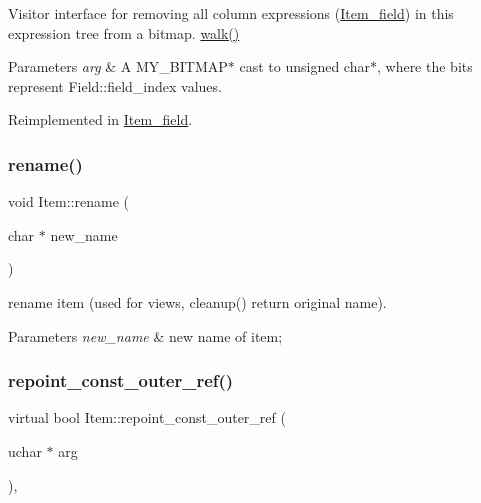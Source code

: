Visitor interface for removing all column expressions (\mbox{\hyperlink{classItem__field}{Item\+\_\+field}}) in this expression tree from a bitmap.  \mbox{\hyperlink{classItem_ab7d2529511c14a77e59a1b1bbabc95d7}{walk()}}


\begin{DoxyParams}{Parameters}
{\em arg} & A M\+Y\+\_\+\+B\+I\+T\+M\+A\+P$\ast$ cast to unsigned char$\ast$, where the bits represent Field\+::field\+\_\+index values. \\
\hline
\end{DoxyParams}


Reimplemented in \mbox{\hyperlink{classItem__field_a4df6afee14222812ccadfe9b1e32d9ee}{Item\+\_\+field}}.

\mbox{\label{classItem_aed7a36014781d07bf5470d1f8652c8f2}} 
\subsubsection{\texorpdfstring{rename()}{rename()}}
{\footnotesize\ttfamily void Item\+::rename (\begin{DoxyParamCaption}\item[{char $\ast$}]{new\+\_\+name }\end{DoxyParamCaption})}

rename item (used for views, cleanup() return original name).


\begin{DoxyParams}{Parameters}
{\em new\+\_\+name} & new name of item; \\
\hline
\end{DoxyParams}
\mbox{\label{classItem_a8deff5e761c2a4fc89e60df1389da969}} 
\subsubsection{\texorpdfstring{repoint\+\_\+const\+\_\+outer\+\_\+ref()}{repoint\_const\_outer\_ref()}}
{\footnotesize\ttfamily virtual bool Item\+::repoint\+\_\+const\+\_\+outer\+\_\+ref (\begin{DoxyParamCaption}\item[{uchar $\ast$}]{arg }\end{DoxyParamCaption})\hspace{0.3cm}{\ttfamily [inline]}, {\ttfamily [virtual]}}

